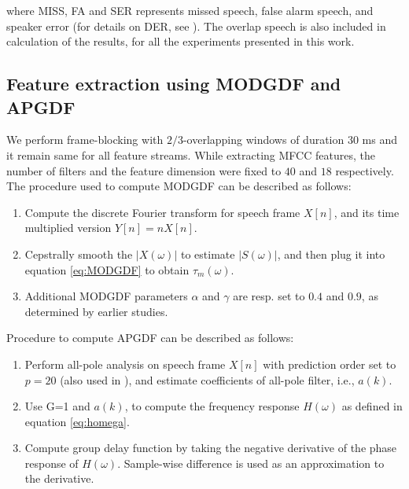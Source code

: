 \documentclass[conference]{IEEEtran}
\begin{document}
where MISS, FA and SER represents  missed speech, false alarm speech, and speaker error (for details on DER, see \cite{NIST}). The overlap speech is also included in calculation of the results, for all the experiments presented in this work. 

\subsection{Feature extraction using MODGDF and APGDF}

We perform frame-blocking with $2/3$-overlapping windows of duration 30 ms and it remain same for all feature streams. While extracting MFCC features, the number of filters and the feature dimension were fixed to $40$ and $18$ respectively. The procedure used to compute MODGDF can be described as follows:

\begin{enumerate}
\item Compute the discrete Fourier transform for speech frame $X[n]$, and its time
multiplied version $Y[n]=nX[n]$.
\item Cepstrally smooth the $|X(\omega)|$ to estimate $|S(\omega)|$,
and then plug it into equation \ref{eq:MODGDF} to obtain $\tau_{m}(\omega)$.
\item Additional MODGDF parameters $\alpha$ and $\gamma$ are resp. set to $0.4$ and $0.9$,
as determined by earlier studies. \cite{modifiedGD}
\end{enumerate}	

\vspace{0.2cm}
Procedure to compute APGDF can be described as follows:
\begin{enumerate}
\item Perform all-pole analysis on speech frame $X[n]$ with prediction order set to
$p=20$ (also used in \cite{allPoleGdSid}), and estimate coefficients of all-pole filter, i.e., $a(k)$.   
\item Use G=1 and $a(k)$, to compute the frequency response $H(\omega)$ as defined
in equation \ref{eq:homega}.
\item Compute group delay function by taking the negative derivative of
the phase response of $H(\omega)$. Sample-wise
difference is used as an approximation to the derivative.
\end{enumerate}	
\vspace{0.2cm}
\end{document}
